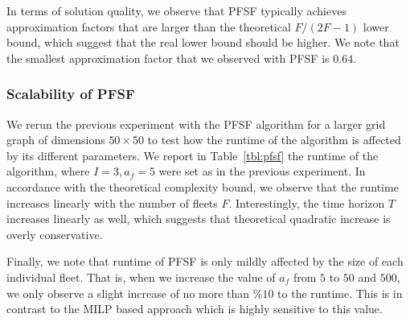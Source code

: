 \documentclass[conference]{IEEEtran}
\newcommand{\todo}[1]{{\color{red}{\bf TODO:} #1}}
\newcommand{\todo}[1]{}
\begin{document}
In terms of solution quality, we observe that PFSF typically achieves approximation factors that are larger than the theoretical $F/(2F-1)$ lower bound, which suggest that the real lower bound should be higher. We note that the smallest approximation factor that we observed with PFSF is $0.64$.

\subsubsection{Scalability of PFSF} 
We rerun the previous experiment with the PFSF algorithm for a larger grid graph of dimensions $50\times 50$ to test how the runtime of the algorithm is affected by its different parameters. We report in Table~\ref{tbl:pfsf} the runtime of the algorithm, where $I=3, a_f=5$ were set as in the previous experiment. In accordance with the theoretical complexity bound, we observe that the runtime increases linearly with the number of fleets $F$. Interestingly, the time horizon $T$ increases linearly as well, which suggests that theoretical quadratic increase is overly conservative. 

Finally, we note that runtime of PFSF is only mildly affected by the size of each individual fleet. That is, when we increase the value of $a_f$ from $5$ to $50$ and $500$, we only observe a slight increase of no more than $\%10$ to the runtime. This is in contrast to the MILP based approach which is highly sensitive to this value. %

\end{document}
